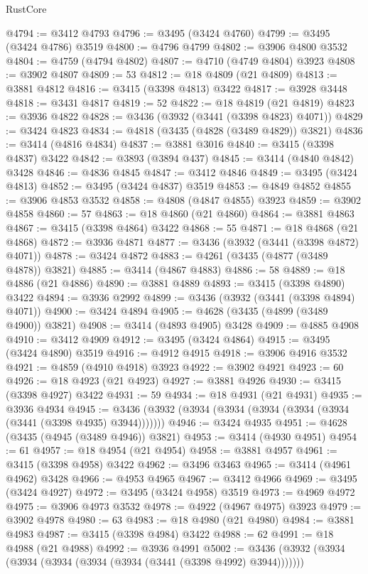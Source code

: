 \begin{lexlean}{RustCore}
\begin{coremodule}
@4794 := @3412 @4793
@4796 := @3495 (@3424 @4760)
@4799 := @3495 (@3424 @4786) @3519
@4800 := @4796 @4799
@4802 := @3906 @4800 @3532
@4804 := @4759 (@4794 @4802)
@4807 := @4710 (@4749 @4804) @3923
@4808 := @3902 @4807
@4809 := 53
@4812 := @18 @4809 (@21 @4809)
@4813 := @3881 @4812
@4816 := @3415 (@3398 @4813) @3422
@4817 := @3928 @3448
@4818 := @3431 @4817
@4819 := 52
@4822 := @18 @4819 (@21 @4819)
@4823 := @3936 @4822
@4828 := @3436 (@3932 (@3441 (@3398 @4823) @4071))
@4829 := @3424 @4823
@4834 := @4818 (@3435 (@4828 (@3489 @4829)) @3821)
@4836 := @3414 (@4816 @4834)
@4837 := @3881 @3016
@4840 := @3415 (@3398 @4837) @3422
@4842 := @3893 (@3894 @437)
@4845 := @3414 (@4840 @4842) @3428
@4846 := @4836 @4845
@4847 := @3412 @4846
@4849 := @3495 (@3424 @4813)
@4852 := @3495 (@3424 @4837) @3519
@4853 := @4849 @4852
@4855 := @3906 @4853 @3532
@4858 := @4808 (@4847 @4855) @3923
@4859 := @3902 @4858
@4860 := 57
@4863 := @18 @4860 (@21 @4860)
@4864 := @3881 @4863
@4867 := @3415 (@3398 @4864) @3422
@4868 := 55
@4871 := @18 @4868 (@21 @4868)
@4872 := @3936 @4871
@4877 := @3436 (@3932 (@3441 (@3398 @4872) @4071))
@4878 := @3424 @4872
@4883 := @4261 (@3435 (@4877 (@3489 @4878)) @3821)
@4885 := @3414 (@4867 @4883)
@4886 := 58
@4889 := @18 @4886 (@21 @4886)
@4890 := @3881 @4889
@4893 := @3415 (@3398 @4890) @3422
@4894 := @3936 @2992
@4899 := @3436 (@3932 (@3441 (@3398 @4894) @4071))
@4900 := @3424 @4894
@4905 := @4628 (@3435 (@4899 (@3489 @4900)) @3821)
@4908 := @3414 (@4893 @4905) @3428
@4909 := @4885 @4908
@4910 := @3412 @4909
@4912 := @3495 (@3424 @4864)
@4915 := @3495 (@3424 @4890) @3519
@4916 := @4912 @4915
@4918 := @3906 @4916 @3532
@4921 := @4859 (@4910 @4918) @3923
@4922 := @3902 @4921
@4923 := 60
@4926 := @18 @4923 (@21 @4923)
@4927 := @3881 @4926
@4930 := @3415 (@3398 @4927) @3422
@4931 := 59
@4934 := @18 @4931 (@21 @4931)
@4935 := @3936 @4934
@4945 := @3436 (@3932 (@3934 (@3934 (@3934 (@3934 (@3934 (@3441 (@3398 @4935) @3944)))))))
@4946 := @3424 @4935
@4951 := @4628 (@3435 (@4945 (@3489 @4946)) @3821)
@4953 := @3414 (@4930 @4951)
@4954 := 61
@4957 := @18 @4954 (@21 @4954)
@4958 := @3881 @4957
@4961 := @3415 (@3398 @4958) @3422
@4962 := @3496 @3463
@4965 := @3414 (@4961 @4962) @3428
@4966 := @4953 @4965
@4967 := @3412 @4966
@4969 := @3495 (@3424 @4927)
@4972 := @3495 (@3424 @4958) @3519
@4973 := @4969 @4972
@4975 := @3906 @4973 @3532
@4978 := @4922 (@4967 @4975) @3923
@4979 := @3902 @4978
@4980 := 63
@4983 := @18 @4980 (@21 @4980)
@4984 := @3881 @4983
@4987 := @3415 (@3398 @4984) @3422
@4988 := 62
@4991 := @18 @4988 (@21 @4988)
@4992 := @3936 @4991
@5002 := @3436 (@3932 (@3934 (@3934 (@3934 (@3934 (@3934 (@3441 (@3398 @4992) @3944)))))))

\end{coremodule}
\end{lexlean}
